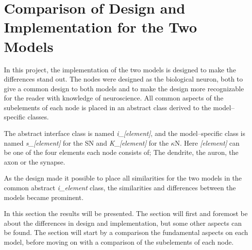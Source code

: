 \section{Comparison of Design and Implementation for the Two Models}


	In this project, the implementation of the two models is designed to make the differences stand out. %
	The nodes were designed as the biological neuron, both to give a common design to both models and to make the design more recognizable for the reader with knowledge of neuroscience.
	All common aspects of the subelements of each node is placed in an abstract class derived to the model--specific classes.

	The abstract interface class is named \emph{i\_[element]}, and the model--specific class is named \emph{s\_[element]} for the SN and \emph{K\_[element]} for the $\kappa$N.
	Here \emph{[element]} can be one of the four elements each node consists of; The dendrite, the auron, the axon or the synapse.

	As the design made it possible to place all similarities for the two models in the common abstract \emph{i\_element} class, the similarities and differences between the models became prominent.
	
	In this section the results will be presented.  %
	The section will first and foremost be about the differences in design and implementation, but some other aspects can be found. %
	The section will start by a comparison the fundamental aspects on each model, before moving on with a comparison of the subelements of each node.

